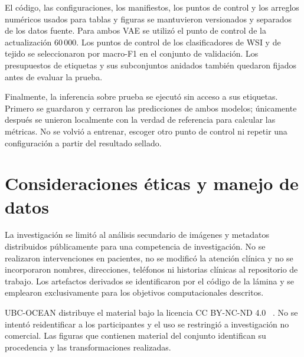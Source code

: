 \begin{samepage}
El código, las configuraciones, los manifiestos, los puntos de control y los
arreglos numéricos usados para tablas y figuras se mantuvieron versionados y
separados de los datos fuente. Para ambos VAE se utilizó el punto de control de
la actualización \(60\,000\). Los puntos de control de los clasificadores de
WSI y de tejido se seleccionaron por macro-F1 en el conjunto de validación.
Los presupuestos de etiquetas y sus subconjuntos
anidados también quedaron fijados antes de evaluar la prueba.
\end{samepage}

Finalmente, la inferencia sobre prueba se ejecutó sin acceso a sus etiquetas.
Primero se guardaron y cerraron las predicciones de ambos modelos; únicamente
después se unieron localmente con la verdad de referencia para calcular las
métricas. No se volvió a entrenar, escoger otro punto de control ni repetir una
configuración a partir del resultado sellado.

\section{Consideraciones éticas y manejo de datos}

La investigación se limitó al análisis secundario de imágenes y metadatos
distribuidos públicamente para una competencia de investigación. No se
realizaron intervenciones en pacientes, no se modificó la atención clínica y
no se incorporaron nombres, direcciones, teléfonos ni historias clínicas al
repositorio de trabajo. Los artefactos derivados se identificaron por el
código de la lámina y se emplearon exclusivamente para los objetivos
computacionales descritos.

UBC-OCEAN distribuye el material bajo la licencia CC BY-NC-ND 4.0
~\cite{ubc_ocean_2023}. No se intentó reidentificar a los participantes y el
uso se restringió a investigación no comercial. Las figuras que contienen
material del conjunto identifican su procedencia y las transformaciones
realizadas.
